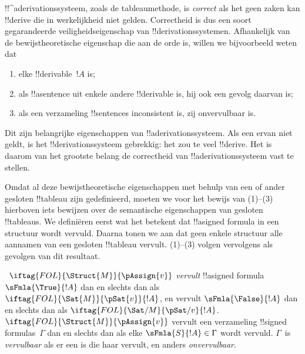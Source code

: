 \documentclass[../../../include/open-logic-section]{subfiles}
\begin{document}
      {}
      {}
      

\begin{explain}
!!^a{derivation}ssysteem, zoals de tableaumethode, is \emph{correct}
als het geen zaken kan !!{derive} die in werkelijkheid niet gelden.
Correctheid is dus een soort gegarandeerde veiligheidseigenschap van
!!{derivation}ssystemen. Afhankelijk van de bewijstheoretische
eigenschap die aan de orde is, willen we bijvoorbeeld weten dat
\begin{enumerate}
\item elke !!{derivable}~$!A$  is;
\item als !!a{sentence} uit enkele andere !!{derivable} is, hij ook een
  gevolg daarvan is;
\item als een verzameling !!{sentence}s inconsistent is, zij
  onvervulbaar is.
\end{enumerate}
Dit zijn belangrijke eigenschappen van !!a{derivation}ssysteem. Als
een ervan niet geldt, is het !!{derivation}ssysteem gebrekkig: het zou
te veel !!{derive}. Het is daarom van het grootste belang de
correctheid van !!a{derivation}ssysteem vast te stellen.

Omdat al deze bewijstheoretische eigenschappen met behulp van een of
ander gesloten !!{tableau} zijn gedefinieerd, moeten we voor het
bewijs van (1)--(3) hierboven iets bewijzen over de semantische
eigenschappen van gesloten !!{tableau}s. We definiëren eerst wat het
betekent dat !!a{signed formula} in een structuur wordt vervuld. Daarna
tonen we aan dat geen enkele structuur alle aannamen van een gesloten
!!{tableau} vervult. (1)--(3) volgen vervolgens als gevolgen van dit
resultaat.
\end{explain}

\begin{defn}
~$\iftag{FOL}{\Struct{M}}{\pAssign{v}}$
\emph{vervult} !!a{signed formula} $\sFmla{\True}{!A}$ dan en slechts
dan als $\iftag{FOL}{\Sat{M}}{\pSat{v}}{!A}$, en vervult
$\sFmla{\False}{!A}$ dan en slechts dan als
$\iftag{FOL}{\Sat/{M}}{\pSat/{v}}{!A}$. $\iftag{FOL}{\Struct{M}}{\pAssign{v}}$
vervult een verzameling !!{signed formula}s~$\Gamma$ dan en slechts
dan als elke $\sFmla{S}{!A} \in \Gamma$ wordt vervuld. $\Gamma$~is
\emph{vervulbaar} als er een 
is die haar vervult, en anders \emph{onvervulbaar}.
\end{defn}
\end{document}
